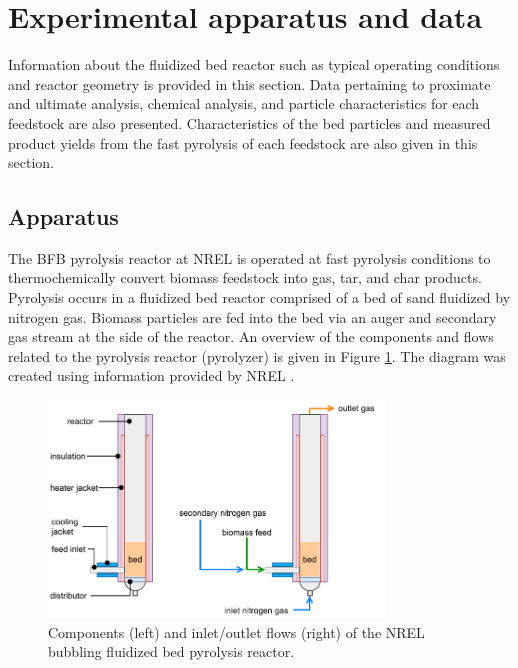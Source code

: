 
\section{Experimental apparatus and data}

Information about the fluidized bed reactor such as typical operating conditions and reactor geometry is provided in this section. Data pertaining to proximate and ultimate analysis, chemical analysis, and particle characteristics for each feedstock are also presented. Characteristics of the bed particles and measured product yields from the fast pyrolysis of each feedstock are also given in this section.

\subsection{Apparatus}

The BFB pyrolysis reactor at NREL is operated at fast pyrolysis conditions to thermochemically convert biomass feedstock into gas, tar, and char products. Pyrolysis occurs in a fluidized bed reactor comprised of a bed of sand fluidized by nitrogen gas. Biomass particles are fed into the bed via an auger and secondary gas stream at the side of the reactor. An overview of the components and flows related to the pyrolysis reactor (pyrolyzer) is given in Figure \ref{fig:pyrolyzer1}. The diagram was created using information provided by NREL \cite{French-2019}.

\begin{figure}[H]
    \centering
    \includegraphics[width=0.8\textwidth]{figures/pyrolyzer1.pdf}
    \caption{Components (left) and inlet/outlet flows (right) of the NREL bubbling fluidized bed pyrolysis reactor.}
    \label{fig:pyrolyzer1}
\end{figure}

